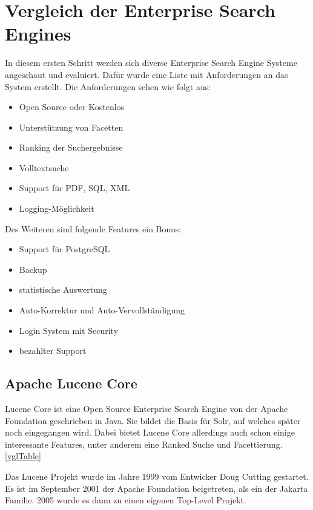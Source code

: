 \chapter{Vergleich der Enterprise Search Engines}

In diesem ersten Schritt werden sich diverse Enterprise Search Engine Systeme angeschaut und evaluiert. Dafür wurde eine Liste mit Anforderungen an das System erstellt. Die Anforderungen sehen wie folgt aus:

\begin{itemize}
    \item Open Source oder Kostenlos
    \item Unterstützung von Facetten
    \item Ranking der Suchergebnisse
    \item Volltextsuche
    \item Support für PDF, SQL, XML
    \item Logging-Möglichkeit
\end{itemize}

Des Weiteren sind folgende Features ein Bonus:

\begin{itemize}
    \item Support für PostgreSQL
    \item Backup
    \item statistische Auswertung
    \item Auto-Korrektur und Auto-Vervollständigung
    \item Login System mit Security
    \item bezahlter Support
\end{itemize}

\section{Apache Lucene Core}

Lucene Core ist eine Open Source Enterprise Search Engine von der Apache Foundation geschrieben in Java. Sie bildet die Basis für Solr, auf welches später noch eingegangen wird. Dabei bietet Lucene Core allerdings auch schon einige interessante Features, unter anderem eine Ranked Suche und Facettierung. \ref{vglTable}

Das Lucene Projekt wurde im Jahre 1999 vom Entwicker Doug Cutting gestartet. Es ist im September 2001 der Apache Foundation beigetreten, als ein der Jakarta Familie. 2005 wurde es dann zu einen eigenen Top-Level Projekt. 

